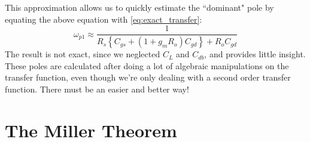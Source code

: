 This approximation allows us to quickly estimate the ``dominant" pole by equating the above equation with \ref{eq:exact_transfer}:
    \begin{equation} 
        {\omega _{p1}} \approx \frac{1}{{{R_s}\left\{ {{C_{gs}} + \left( {1 + {g_m}{{R}_{o}}} \right){C_{gd}}} \right\} + {{R}_{o}}{C_{gd}}}}  \label{eq:pole_almost_exact}
    \end{equation}
The result is not exact, since we neglected $C_L$ and $C_{db}$, and provides little insight.  These poles are calculated after doing a lot of algebraic manipulations on the transfer function, even though we're only dealing with a second order transfer function. There must be an easier and better way!
\section{The Miller Theorem}
